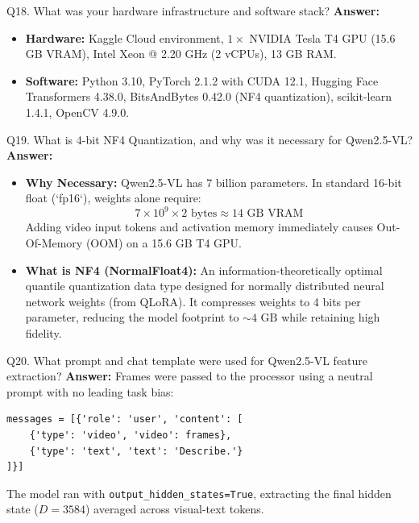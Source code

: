 \documentclass[a4paper, 11pt]{article}
\begin{document}
\begin{questionbox}{Q18. What was your hardware infrastructure and software stack?}
\textbf{Answer:}
\begin{itemize}
    \item \textbf{Hardware:} Kaggle Cloud environment, $1 \times$ NVIDIA Tesla T4 GPU (15.6 GB VRAM), Intel Xeon @ 2.20 GHz (2 vCPUs), 13 GB RAM.
    \item \textbf{Software:} Python 3.10, PyTorch 2.1.2 with CUDA 12.1, Hugging Face Transformers 4.38.0, BitsAndBytes 0.42.0 (NF4 quantization), scikit-learn 1.4.1, OpenCV 4.9.0.
\end{itemize}
\end{questionbox}

\begin{questionbox}{Q19. What is 4-bit NF4 Quantization, and why was it necessary for Qwen2.5-VL?}
\textbf{Answer:}
\begin{itemize}
    \item \textbf{Why Necessary:} Qwen2.5-VL has 7 billion parameters. In standard 16-bit float (`fp16`), weights alone require:
    \[
    7 \times 10^9 \times 2 \text{ bytes} \approx 14\text{ GB VRAM}
    \]
    Adding video input tokens and activation memory immediately causes Out-Of-Memory (OOM) on a 15.6 GB T4 GPU.
    \item \textbf{What is NF4 (NormalFloat4):} An information-theoretically optimal quantile quantization data type designed for normally distributed neural network weights (from QLoRA). It compresses weights to 4 bits per parameter, reducing the model footprint to $\sim 4\text{ GB}$ while retaining high fidelity.
\end{itemize}
\end{questionbox}

\begin{questionbox}{Q20. What prompt and chat template were used for Qwen2.5-VL feature extraction?}
\textbf{Answer:}
Frames were passed to the processor using a neutral prompt with no leading task bias:
\begin{verbatim}
messages = [{'role': 'user', 'content': [
    {'type': 'video', 'video': frames},
    {'type': 'text', 'text': 'Describe.'}
]}]
\end{verbatim}
The model ran with \texttt{output\_hidden\_states=True}, extracting the final hidden state ($D=3584$) averaged across visual-text tokens.
\end{questionbox}
\end{document}

